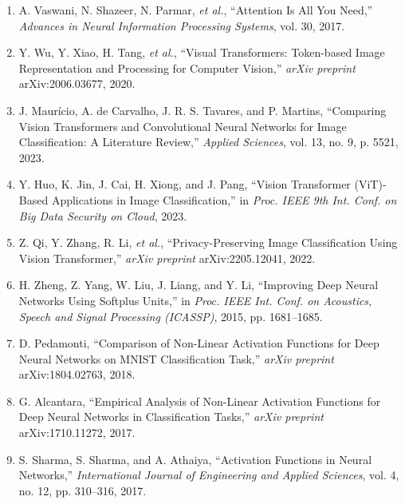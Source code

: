 \begin{enumerate}
\item A. Vaswani, N. Shazeer, N. Parmar, \textit{et al.}, ``Attention Is All You Need,'' \textit{Advances in Neural Information Processing Systems}, vol. 30, 2017.

\item Y. Wu, Y. Xiao, H. Tang, \textit{et al.}, ``Visual Transformers: Token-based Image Representation and Processing for Computer Vision,'' \textit{arXiv preprint} arXiv:2006.03677, 2020.

\item J. Maur\'{i}cio, A. de Carvalho, J. R. S. Tavares, and P. Martins, ``Comparing Vision Transformers and Convolutional Neural Networks for Image Classification: A Literature Review,'' \textit{Applied Sciences}, vol. 13, no. 9, p. 5521, 2023.

\item Y. Huo, K. Jin, J. Cai, H. Xiong, and J. Pang, ``Vision Transformer (ViT)-Based Applications in Image Classification,'' in \textit{Proc. IEEE 9th Int. Conf. on Big Data Security on Cloud}, 2023.

\item Z. Qi, Y. Zhang, R. Li, \textit{et al.}, ``Privacy-Preserving Image Classification Using Vision Transformer,'' \textit{arXiv preprint} arXiv:2205.12041, 2022.

\item H. Zheng, Z. Yang, W. Liu, J. Liang, and Y. Li, ``Improving Deep Neural Networks Using Softplus Units,'' in \textit{Proc. IEEE Int. Conf. on Acoustics, Speech and Signal Processing (ICASSP)}, 2015, pp. 1681--1685.

\item D. Pedamonti, ``Comparison of Non-Linear Activation Functions for Deep Neural Networks on MNIST Classification Task,'' \textit{arXiv preprint} arXiv:1804.02763, 2018.

\item G. Alcantara, ``Empirical Analysis of Non-Linear Activation Functions for Deep Neural Networks in Classification Tasks,'' \textit{arXiv preprint} arXiv:1710.11272, 2017.

\item S. Sharma, S. Sharma, and A. Athaiya, ``Activation Functions in Neural Networks,'' \textit{International Journal of Engineering and Applied Sciences}, vol. 4, no. 12, pp. 310--316, 2017.
\end{enumerate}
